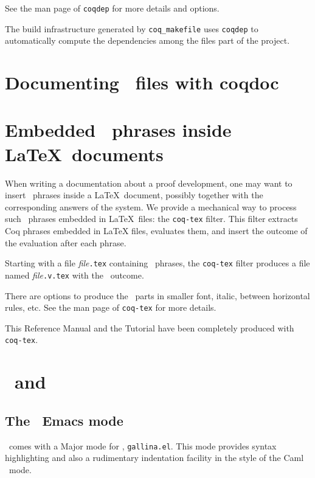 See the man page of {\tt coqdep} for more details and options.

The build infrastructure generated by {\tt coq\_makefile}
uses {\tt coqdep} to automatically compute the dependencies
among the files part of the project.

\section[Documenting \Coq\ files with coqdoc]{Documenting \Coq\ files with coqdoc\label{coqdoc}
}



\section[Embedded \Coq\ phrases inside \LaTeX\ documents]{Embedded \Coq\ phrases inside \LaTeX\ documents\label{Latex}
  }

When writing a documentation about a proof development, one may want
to insert \Coq\ phrases inside a \LaTeX\ document, possibly together with
the corresponding answers of the system. We provide a
mechanical way to process such \Coq\ phrases embedded in \LaTeX\ files: the
{\tt coq-tex} filter.  This filter extracts Coq phrases embedded in
LaTeX files, evaluates them, and insert the outcome of the evaluation
after each phrase.

Starting with a file {\em file}{\tt.tex} containing \Coq\ phrases,
the {\tt coq-tex} filter produces a file named {\em file}{\tt.v.tex} with
the \Coq\ outcome.

There are options to produce the \Coq\ parts in smaller font, italic,
between horizontal rules, etc.
See the man page of {\tt coq-tex} for more details.

\medskip{} This Reference Manual and the Tutorial
have been completely produced with {\tt coq-tex}.


\section[\Coq\ and \emacs]{\Coq\ and \emacs\label{Emacs}}

\subsection{The \Coq\ Emacs mode}

\Coq\ comes with a Major mode for \emacs, {\tt gallina.el}. This mode provides
syntax highlighting
and also a rudimentary indentation facility
in the style of the Caml \emacs\ mode.

